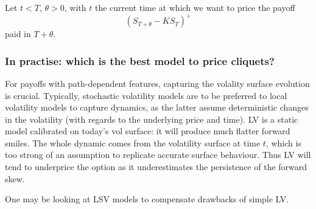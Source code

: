 Let $t < T$, $\theta>0$, with $t$ the current time at which we want to price the payoff \[(S_{T + \theta} - KS_{T})^{+}\] paid in $T+\theta$.

\subsubsection*{In practise: which is the best model to price cliquets?}

For payoffs with path-dependent features, capturing the volality surface evolution is crucial. Typically, stochastic volatility models are to be preferred to local volatility models to capture dynamics, as the latter assume deterministic changes in the volatility (with regards to the underlying price and time). \newline LV is a static model calibrated on today's vol surface: it will produce much flatter forward smiles. The whole dynamic comes from the volatility surface at time $t$, which is too strong of an assumption to replicate accurate surface behaviour. Thus LV will tend to underprice the option as it underestimates the persistence of the forward skew.

One may be looking at LSV models to compensate drawbacks of simple LV.